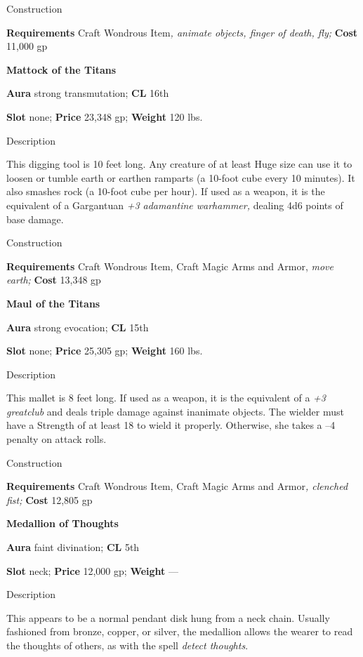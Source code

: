 Construction
				
\textbf{Requirements} Craft Wondrous Item\textit{, animate objects, finger of death, fly;}\textbf{ Cost }11,000 gp
				
\textbf{Mattock of the Titans}
				
\textbf{Aura} strong transmutation; \textbf{CL} 16th
				
\textbf{Slot} none; \textbf{Price} 23,348 gp; \textbf{Weight} 120 lbs.
				
Description
				
This digging tool is 10 feet long. Any creature of at least Huge size can use it to loosen or tumble earth or earthen ramparts (a 10-foot cube every 10 minutes). It also smashes rock (a 10-foot cube per hour). If used as a weapon, it is the equivalent of a Gargantuan\textit{ +3 adamantine warhammer,} dealing 4d6 points of base damage. 
				
Construction
				
\textbf{Requirements} Craft Wondrous Item, Craft Magic Arms and Armor,\textit{ move earth; }\textbf{Cost }13,348 gp
				
\textbf{Maul of the Titans}
				
\textbf{Aura} strong evocation;\textbf{ CL }15th
				
\textbf{Slot} none; \textbf{Price} 25,305 gp; \textbf{Weight} 160 lbs.
				
Description
				
This mallet is 8 feet long. If used as a weapon, it is the equivalent of a \textit{+3 greatclub} and deals triple damage against inanimate objects. The wielder must have a Strength of at least 18 to wield it properly. Otherwise, she takes a --4 penalty on attack rolls. 
				
Construction
				
\textbf{Requirements} Craft Wondrous Item, Craft Magic Arms and Armor\textit{, clenched fist; }\textbf{Cost }12,805 gp
				
\textbf{Medallion of Thoughts}
				
\textbf{Aura} faint divination;\textbf{ CL }5th
				
\textbf{Slot} neck; \textbf{Price} 12,000 gp; \textbf{Weight }---
				
Description
				
This appears to be a normal pendant disk hung from a neck chain. Usually fashioned from bronze, copper, or silver, the medallion allows the wearer to read the thoughts of others, as with the spell \textit{detect thoughts}. 
				
